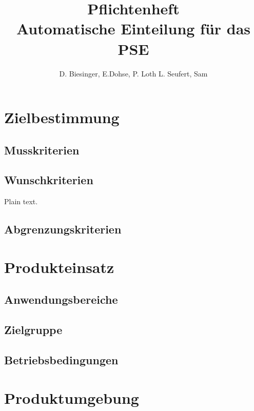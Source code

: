 \documentclass[parskip=full]{scrartcl}
\begin{document}
\title{Pflichtenheft \\
        \large Automatische Einteilung für das PSE}

\author{D. Biesinger, E.Dohse, P. Loth L. Seufert, Sam}
        
\maketitle
\vfill

\tableofcontents


\section{Zielbestimmung}


\subsection{Musskriterien}

\subsection{Wunschkriterien}
Plain text.

\subsection{Abgrenzungskriterien}

\section{Produkteinsatz}

\subsection{Anwendungsbereiche}

\subsection{Zielgruppe}

\subsection{Betriebsbedingungen}

\section{Produktumgebung}
\end{document}
